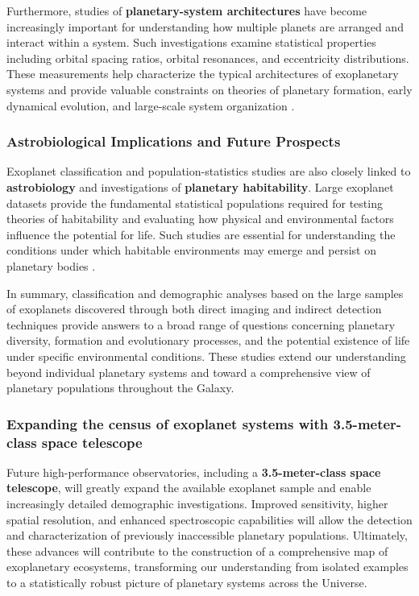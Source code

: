 Furthermore, studies of \textbf{planetary-system architectures} have become increasingly important for understanding how multiple planets are arranged and interact within a system. Such investigations examine statistical properties including orbital spacing ratios, orbital resonances, and eccentricity distributions. These measurements help characterize the typical architectures of exoplanetary systems and provide valuable constraints on theories of planetary formation, early dynamical evolution, and large-scale system organization \cite{howe2025}.

\subsubsection{Astrobiological Implications and Future Prospects}

Exoplanet classification and population-statistics studies are also closely linked to \textbf{astrobiology} and investigations of \textbf{planetary habitability}. Large exoplanet datasets provide the fundamental statistical populations required for testing theories of habitability and evaluating how physical and environmental factors influence the potential for life. Such studies are essential for understanding the conditions under which habitable environments may emerge and persist on planetary bodies \cite{hong2023}.

In summary, classification and demographic analyses based on the large samples of exoplanets discovered through both direct imaging and indirect detection techniques provide answers to a broad range of questions concerning planetary diversity, formation and evolutionary processes, and the potential existence of life under specific environmental conditions. These studies extend our understanding beyond individual planetary systems and toward a comprehensive view of planetary populations throughout the Galaxy.

\subsubsection{Expanding the census of exoplanet systems with 3.5-meter-class space telescope}

Future high-performance observatories, including a \textbf{3.5-meter-class space telescope}, will greatly expand the available exoplanet sample and enable increasingly detailed demographic investigations. Improved sensitivity, higher spatial resolution, and enhanced spectroscopic capabilities will allow the detection and characterization of previously inaccessible planetary populations. Ultimately, these advances will contribute to the construction of a comprehensive map of exoplanetary ecosystems, transforming our understanding from isolated examples to a statistically robust picture of planetary systems across the Universe.


